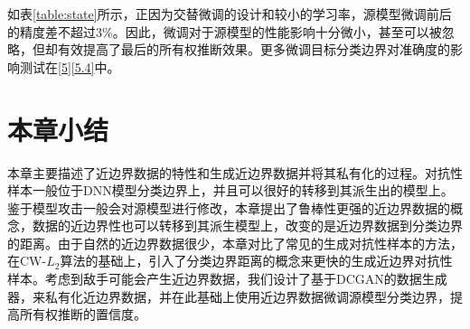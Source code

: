 如表\ref{table:state}所示，正因为交替微调的设计和较小的学习率，源模型微调前后的精度差不超过3\%。因此，微调对于源模型的性能影响十分微小，甚至可以被忽略，但却有效提高了最后的所有权推断效果。更多微调目标分类边界对准确度的影响测试在\ref{5}\ref{5.4}中。


\section{本章小结}

本章主要描述了近边界数据的特性和生成近边界数据并将其私有化的过程。对抗性样本一般位于DNN模型分类边界上，并且可以很好的转移到其派生出的模型上。鉴于模型攻击一般会对源模型进行修改，本章提出了鲁棒性更强的近边界数据的概念，数据的近边界性也可以转移到其派生模型上，改变的是近边界数据到分类边界的距离。由于自然的近边界数据很少，本章对比了常见的生成对抗性样本的方法，在CW-$L_2$算法的基础上，引入了分类边界距离的概念来更快的生成近边界对抗性样本。考虑到敌手可能会产生近边界数据，我们设计了基于DCGAN的数据生成器，来私有化近边界数据，并在此基础上使用近边界数据微调源模型分类边界，提高所有权推断的置信度。
